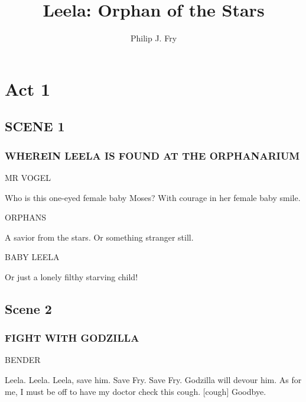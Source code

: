 \documentclass[12pt]{article}
\title{Leela: Orphan of the Stars}
\author{Philip J. Fry}
\begin{document}
\maketitle

\section*{Act 1}

\subsection*{SCENE 1}

\subsubsection*{WHEREIN LEELA IS FOUND AT THE ORPHANARIUM}

MR VOGEL

Who is this one-eyed female baby Moses?
With courage in her female baby smile.

ORPHANS

A savior from the stars.
Or something stranger still.

BABY LEELA

Or just a lonely filthy starving child!

\subsection*{Scene 2}

\subsubsection*{FIGHT WITH GODZILLA}

BENDER

Leela. Leela. Leela, save him.
Save Fry. Save Fry.
Godzilla will devour him.
As for me, I must be off
to have my doctor check this cough.
[cough] Goodbye.
\end{document}
